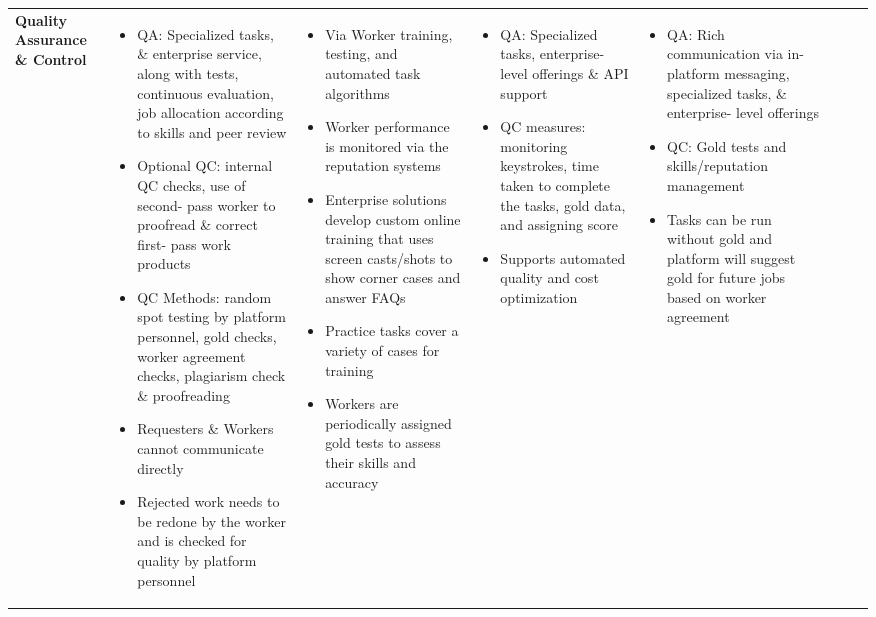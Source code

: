 \documentclass{sigchi}
\begin{document}
\begin{sidewaystable*}
\begin{tabular}[h]{| p{1.5cm}| p{2.7cm}| p{2.7cm}| p{2.7cm}| p{2.7cm}| p{2.7cm}| p{2.7cm}| p{2.7cm}|}
{\bf Quality Assurance \& Control
} & 
{
\begin{itemize} [noitemsep,nolistsep]
\item  QA: Specialized tasks, \& enterprise service, along with tests, continuous evaluation, job allocation according to skills and peer review
\item  Optional QC: internal QC checks, use of second- pass worker to proofread \& correct first- pass work products
\item  QC Methods: random spot testing by platform personnel, gold checks, worker agreement checks, plagiarism check \& proofreading
\item  Requesters \& Workers cannot communicate directly
\item  Rejected work needs to be redone by the worker and is checked for quality by platform personnel
\end{itemize}
} &
{
\begin{itemize} [noitemsep,nolistsep]
\item  Via Worker training, testing, and automated task algorithms
\item  Worker performance is monitored via the reputation systems
\item  Enterprise solutions develop custom online training that uses screen casts/shots to show corner cases and answer FAQs
\item  Practice tasks cover a variety of cases for training
\item  Workers are periodically assigned gold tests to assess their skills and accuracy
\end{itemize}
} &
{
\begin{itemize} [noitemsep,nolistsep]
\item  QA: Specialized tasks, enterprise- level offerings \& API support
\item  QC measures: monitoring keystrokes, time taken to complete the tasks, gold data, and assigning score
\item  Supports automated quality and cost optimization
\end{itemize}
} &
{
\begin{itemize} [noitemsep,nolistsep]
\item  QA: Rich communication via in- platform messaging, specialized tasks, \& enterprise- level offerings
\item  QC: Gold tests and skills/reputation management
\item  Tasks can be run without gold and platform will suggest gold for future jobs based on worker agreement

\end{itemize}}
\end{tabular}
\end{sidewaystable*}
\end{document}
